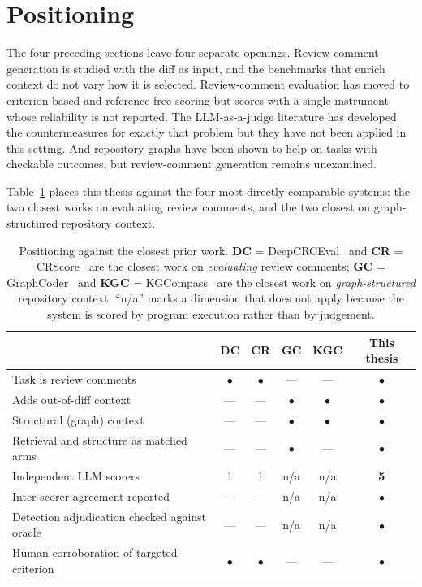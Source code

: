 \section{Positioning}
\label{sec:sota-positioning}

The four preceding sections leave four separate openings. Review-comment
generation is studied with the diff as input, and the benchmarks that enrich
context do not vary how it is selected. Review-comment evaluation has moved to
criterion-based and reference-free scoring but scores with a single instrument
whose reliability is not reported. The LLM-as-a-judge literature has developed the
countermeasures for exactly that problem but they have not been applied in this
setting. And repository graphs have been shown to help on tasks with checkable
outcomes, but review-comment generation remains unexamined.

Table~\ref{tab:sota-positioning} places this thesis against the four most directly
comparable systems: the two closest works on evaluating review comments, and the
two closest on graph-structured repository context.

\begin{table}[htbp]
    \centering
    \caption{Positioning against the closest prior work. \textbf{DC} =
             DeepCRCEval~\cite{hong2024deepcrceval} and \textbf{CR} =
             CRScore~\cite{naik2025crscore} are the closest work on
             \emph{evaluating} review comments; \textbf{GC} =
             GraphCoder~\cite{liu2024graphcoder} and \textbf{KGC} =
             KGCompass~\cite{yang2025kgcompass} are the closest work on
             \emph{graph-structured} repository context. ``n/a'' marks a dimension
             that does not apply because the system is scored by program execution
             rather than by judgement.}
    \label{tab:sota-positioning}
    \small
    \begin{tabularx}{\textwidth}{@{}Xccccc@{}}
        \toprule
          & DC & CR & GC & KGC & \textbf{This thesis} \\
        \midrule
        Task is review comments
          & $\bullet$ & $\bullet$ & --- & --- & $\bullet$ \\
        Adds out-of-diff context
          & --- & --- & $\bullet$ & $\bullet$ & $\bullet$ \\
        Structural (graph) context
          & --- & --- & $\bullet$ & $\bullet$ & $\bullet$ \\
        Retrieval and structure as matched arms
          & --- & --- & $\bullet$ & --- & $\bullet$ \\
        Independent LLM scorers
          & 1 & 1 & n/a & n/a & \textbf{5} \\
        Inter-scorer agreement reported
          & --- & --- & n/a & n/a & $\bullet$ \\
        Detection adjudication checked against oracle
          & --- & --- & n/a & n/a & $\bullet$ \\
        Human corroboration of targeted criterion
          & $\bullet$ & $\bullet$ & --- & --- & $\bullet$ \\
        \bottomrule
    \end{tabularx}
\end{table}

